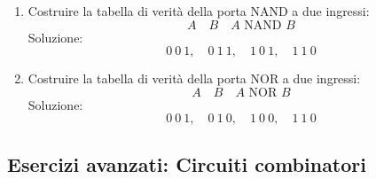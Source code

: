 \documentclass[12pt,a4paper]{article}
\begin{document}
\begin{enumerate}
    \item Costruire la tabella di verità della porta NAND a due ingressi:
    \[
    A\quad B\quad A\text{ NAND }B
    \]
    Soluzione:
    \[
    0\ 0\ 1, \quad 0\ 1\ 1, \quad 1\ 0\ 1, \quad 1\ 1\ 0
    \]

    \item Costruire la tabella di verità della porta NOR a due ingressi:
    \[
    A\quad B\quad A\text{ NOR }B
    \]
    Soluzione:
    \[
    0\ 0\ 1, \quad 0\ 1\ 0, \quad 1\ 0\ 0, \quad 1\ 1\ 0
    \]
\end{enumerate}

\subsection{Esercizi avanzati: Circuiti combinatori}
\end{document}
